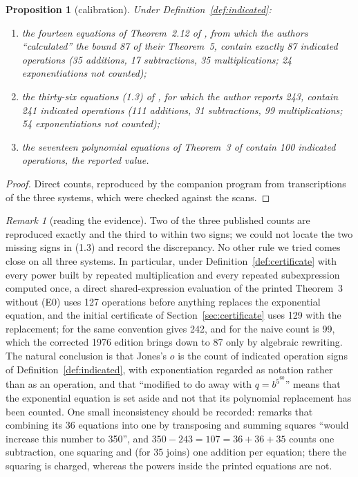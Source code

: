 \documentclass[11pt,letterpaper]{article}
\newtheorem{proposition}[theorem]{Proposition}
\theoremstyle{definition}
\theoremstyle{remark}
\newtheorem{remark}[theorem]{Remark}
\numberwithin{equation}{section}
\begin{document}
\begin{proposition}[calibration]\label{prop:calibration}
Under Definition~\ref{def:indicated}:
\begin{enumerate}[nosep]
\item the fourteen equations of Theorem~2.12 of \cite{JSWW}, from which the
 authors ``calculated'' the bound 87 of their Theorem~5, contain exactly 87
 indicated operations (35 additions, 17 subtractions, 35 multiplications;
 24 exponentiations not counted);
\item the thirty-six equations \textup{(1.3)} of \cite{J78}, for which the
 author reports 243, contain 241 indicated operations (111 additions,
 31 subtractions, 99 multiplications; 54 exponentiations not counted);
\item the seventeen polynomial equations of Theorem~3 of \cite{J80} contain
 100 indicated operations, the reported value.
\end{enumerate}
\end{proposition}

\begin{proof}
Direct counts, reproduced by the companion program from transcriptions of
the three systems, which were checked against the scans.
\end{proof}

\begin{remark}[reading the evidence]\label{rem:evidence}
Two of the three published counts are reproduced exactly and the third to
within two signs; we could not locate the two missing signs in (1.3) and
record the discrepancy. No other rule we tried comes close on all three
systems. In particular, under Definition~\ref{def:certificate} with every
power built by repeated multiplication and every repeated subexpression
computed once, a direct shared-expression evaluation of the printed
Theorem~3 without (E0) uses 127 operations before anything replaces the
exponential equation, and the initial certificate of
Section~\ref{sec:certificate} uses 129 with the
replacement; for \cite{J78} the same convention gives 242, and for
\cite{JSWW} the naive count is 99, which the corrected 1976 edition brings down to 87
only by algebraic rewriting. The natural conclusion is that Jones's $o$ is
the count of indicated operation signs of Definition~\ref{def:indicated},
with exponentiation regarded as notation rather than as an operation, and
that ``modified to do away with $q=b^{5^{60}}$'' means that the exponential
equation is set aside and not that its polynomial replacement has been
counted. One small inconsistency should be recorded: \cite{J78} remarks that
combining its 36 equations into one by transposing and summing squares
``would increase this number to 350'', and $350-243=107=36+36+35$ counts
one subtraction, one squaring and (for 35 joins) one addition per equation;
there the squaring is charged, whereas the powers inside the printed
equations are not.
\end{remark}
\end{document}
